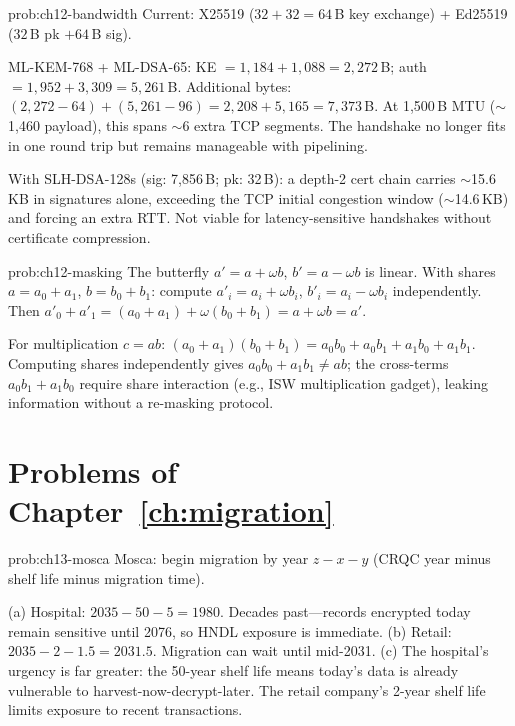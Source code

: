 \begin{sol}{prob:ch12-bandwidth}
Current: X25519 ($32+32=64$\,B key exchange) + Ed25519 ($32$\,B pk $+ 64$\,B sig).

ML-KEM-768 + ML-DSA-65: KE $=1{,}184+1{,}088=2{,}272$\,B; auth $=1{,}952+3{,}309=5{,}261$\,B.
Additional bytes: $(2{,}272-64)+(5{,}261-96)=2{,}208+5{,}165=7{,}373$\,B.
At 1,500\,B MTU ($\sim$1,460 payload), this spans $\sim$6 extra TCP segments.  The handshake no longer fits in one round trip but remains manageable with pipelining.

With SLH-DSA-128s (sig: 7,856\,B; pk: 32\,B): a depth-2 cert chain carries $\sim$15.6\,KB in signatures alone, exceeding the TCP initial congestion window ($\sim$14.6\,KB) and forcing an extra RTT.  Not viable for latency-sensitive handshakes without certificate compression.
\end{sol}

\begin{sol}{prob:ch12-masking}
The butterfly $a'=a+\omega b$, $b'=a-\omega b$ is linear.  With shares $a=a_0+a_1$, $b=b_0+b_1$:
compute $a'_i=a_i+\omega b_i$, $b'_i=a_i-\omega b_i$ independently.  Then $a'_0+a'_1=(a_0+a_1)+\omega(b_0+b_1)=a+\omega b=a'$.\;\checkmark

For multiplication $c=ab$: $(a_0+a_1)(b_0+b_1)=a_0b_0+a_0b_1+a_1b_0+a_1b_1$.  Computing shares independently gives $a_0b_0+a_1b_1\neq ab$; the cross-terms $a_0b_1+a_1b_0$ require share interaction (e.g., ISW multiplication gadget), leaking information without a re-masking protocol.
\end{sol}

\section*{Problems of Chapter~\ref{ch:migration}}

\begin{sol}{prob:ch13-mosca}
Mosca: begin migration by year $z-x-y$ (CRQC year minus shelf life minus migration time).

(a) Hospital: $2035-50-5=1980$.  Decades past---records encrypted today remain sensitive until 2076, so HNDL exposure is immediate.
(b) Retail: $2035-2-1.5=2031.5$.  Migration can wait until mid-2031.
(c) The hospital's urgency is far greater: the 50-year shelf life means today's data is already vulnerable to harvest-now-decrypt-later.  The retail company's 2-year shelf life limits exposure to recent transactions.
\end{sol}

